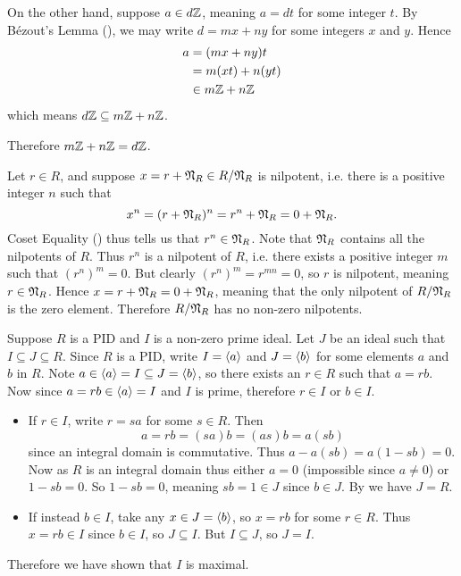 \begin{questions}
\begin{partquestions}{\alph*}
        On the other hand, suppose $a \in d\mathbb{Z}$, meaning $a = dt$ for some integer $t$. By B\'{e}zout's Lemma (), we may write $d = mx + ny$ for some integers $x$ and $y$. Hence
        \begin{align*}
            a &= (mx + ny)t\\
            &= m(xt) + n(yt)\\
            &\in m\mathbb{Z} + n\mathbb{Z}
        \end{align*}
        which means $d\mathbb{Z} \subseteq m\mathbb{Z} + n\mathbb{Z}$.

        Therefore $m\mathbb{Z} + n\mathbb{Z} = d\mathbb{Z}$.
    \end{partquestions}

    \item Let $r \in R$, and suppose $x = r + \mathfrak{N}_{R} \in R/\mathfrak{N}_{R}$ is nilpotent, i.e. there is a positive integer $n$ such that
    \[
        x^n = (r + \mathfrak{N}_{R})^n = r^n + \mathfrak{N}_{R} = 0 + \mathfrak{N}_{R}.
    \]
    Coset Equality () thus tells us that $r^n \in \mathfrak{N}_{R}$. Note that $\mathfrak{N}_{R}$ contains all the nilpotents of $R$. Thus $r^n$ is a nilpotent of $R$, i.e. there exists a positive integer $m$ such that $(r^n)^m = 0$. But clearly $(r^n)^m = r^{mn} = 0$, so $r$ is nilpotent, meaning $r \in \mathfrak{N}_{R}$. Hence $x = r + \mathfrak{N}_{R} = 0 + \mathfrak{N}_{R}$, meaning that the only nilpotent of $R/\mathfrak{N}_{R}$ is the zero element. Therefore $R/\mathfrak{N}_{R}$ has no non-zero nilpotents.

    \item Suppose $R$ is a PID and $I$ is a non-zero prime ideal. Let $J$ be an ideal such that $I \subseteq J \subseteq R$. Since $R$ is a PID, write $I = \left\langle a\right\rangle$ and $J = \left\langle b\right\rangle$ for some elements $a$ and $b$ in $R$. Note $a \in \left\langle a\right\rangle = I \subseteq J = \left\langle b\right\rangle$, so there exists an $r \in R$ such that $a = rb$. Now since $a = rb \in \left\langle a\right\rangle = I$ and $I$ is prime, therefore $r \in I$ or $b \in I$.
    \begin{itemize}
        \item If $r \in I$, write $r = sa$ for some $s \in R$. Then
        \[
            a = rb = (sa)b = (as)b = a(sb)
        \]
        since an integral domain is commutative. Thus $a - a(sb) = a(1-sb) = 0$. Now as $R$ is an integral domain thus either $a = 0$ (impossible since $a \neq 0$) or $1-sb = 0$. So $1-sb = 0$, meaning $sb = 1 \in J$ since $b \in J$. By  we have $J = R$.
        \item If instead $b \in I$, take any $x \in J = \left\langle b\right\rangle$, so $x = rb$ for some $r \in R$. Thus $x = rb \in I$ since $b \in I$, so $J \subseteq I$. But $I \subseteq J$, so $J = I$.
    \end{itemize}
    Therefore we have shown that $I$ is maximal.


\end{questions}
